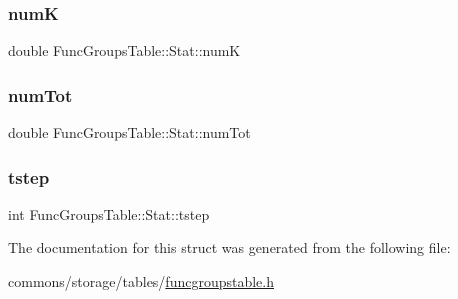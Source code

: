 \subsubsection{\texorpdfstring{numK}{numK}}
{\footnotesize\ttfamily double Func\+Groups\+Table\+::\+Stat\+::numK}

\mbox{\label{struct_func_groups_table_1_1_stat_a42ea42633b50033177c8c5bed4bb5181}} 
\subsubsection{\texorpdfstring{numTot}{numTot}}
{\footnotesize\ttfamily double Func\+Groups\+Table\+::\+Stat\+::num\+Tot}

\mbox{\label{struct_func_groups_table_1_1_stat_ad537e21caef9ced7c1363be875f41d72}} 
\subsubsection{\texorpdfstring{tstep}{tstep}}
{\footnotesize\ttfamily int Func\+Groups\+Table\+::\+Stat\+::tstep}



The documentation for this struct was generated from the following file\+:\begin{DoxyCompactItemize}
\item 
commons/storage/tables/\mbox{\hyperlink{funcgroupstable_8h}{funcgroupstable.\+h}}\end{DoxyCompactItemize}
